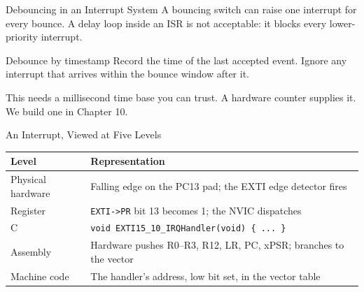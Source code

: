 \documentclass[9pt,aspectratio=169,xcolor=table]{beamer}
\begin{document}
\begin{frame}{Debouncing in an Interrupt System}
    \leavevmode
    A bouncing switch can raise \alert{one interrupt for every bounce}. A delay loop inside an ISR is not acceptable: it blocks every lower-priority interrupt.

    \vspace{3mm}
    \begin{block}{Debounce by timestamp}
        Record the time of the last accepted event. Ignore any interrupt that arrives within the bounce window after it.
    \end{block}

    \vspace{3mm}
    {\small This needs a \alert{millisecond time base} you can trust. A hardware counter supplies it. We build one in Chapter 10.}
\end{frame}

\begin{frame}{An Interrupt, Viewed at Five Levels}
    \begin{center}
    {\small
    \striped
    \begin{tabular}{@{}l R{.62\textwidth}@{}}
        \toprule
        \textbf{Level} & \textbf{Representation} \\
        \midrule
        Physical hardware & Falling edge on the PC13 pad; the EXTI edge detector fires \\
        Register & \texttt{EXTI->PR} bit 13 becomes 1; the NVIC dispatches \\
        C & \texttt{void EXTI15\_10\_IRQHandler(void) \{ ... \}} \\
        Assembly & Hardware pushes R0--R3, R12, LR, PC, xPSR; branches to the vector \\
        Machine code & The handler's address, low bit set, in the vector table \\
        \bottomrule
    \end{tabular}}
    \end{center}
\end{frame}
\end{document}
